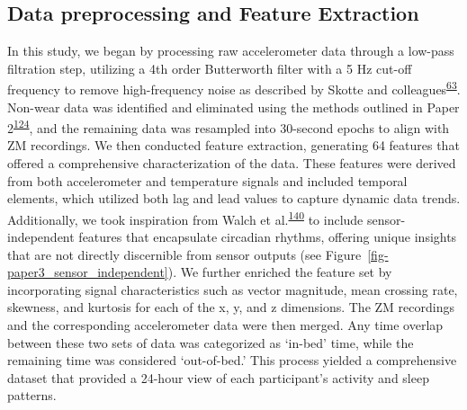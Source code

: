 \documentclass[
  10pt,
]{scrbook}
\begin{document}
\hypertarget{data-preprocessing-and-feature-extraction}{%
\subsection{Data preprocessing and Feature
Extraction}\label{data-preprocessing-and-feature-extraction}}

In this study, we began by processing raw accelerometer data through a
low-pass filtration step, utilizing a 4th order Butterworth filter with
a 5 Hz cut-off frequency to remove high-frequency noise as described by
Skotte and
colleagues\textsuperscript{\protect\hyperlink{ref-skotte_detection_2014}{63}}.
Non-wear data was identified and eliminated using the methods outlined
in Paper
2\textsuperscript{\protect\hyperlink{ref-skovgaard_generalizability_2023}{124}},
and the remaining data was resampled into 30-second epochs to align with
ZM recordings. We then conducted feature extraction, generating 64
features that offered a comprehensive characterization of the data.
These features were derived from both accelerometer and temperature
signals and included temporal elements, which utilized both lag and lead
values to capture dynamic data trends. Additionally, we took inspiration
from Walch et
al.\textsuperscript{\protect\hyperlink{ref-walch_sleep_2019}{140}} to
include sensor-independent features that encapsulate circadian rhythms,
offering unique insights that are not directly discernible from sensor
outputs (see Figure~\ref{fig-paper3_sensor_independent}). We further
enriched the feature set by incorporating signal characteristics such as
vector magnitude, mean crossing rate, skewness, and kurtosis for each of
the x, y, and z dimensions. The ZM recordings and the corresponding
accelerometer data were then merged. Any time overlap between these two
sets of data was categorized as `in-bed' time, while the remaining time
was considered `out-of-bed.' This process yielded a comprehensive
dataset that provided a 24-hour view of each participant's activity and
sleep patterns.
\end{document}
